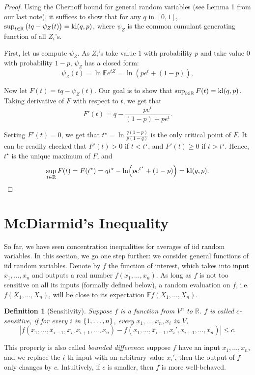 \documentclass{article}
\newtheorem{definition}{Definition}
\DeclareMathOperator*{\kl}{{\rm kl}}
\newcommand{\RR}{\mathbb{R}} %
\newcommand{\EE}{\mathbb{E}} %
\begin{document}
\begin{proof}
Using the Chernoff bound for general random variables (see Lemma 1 from our last note), it suffices to show that for any $q$ in $[0,1]$, $\sup_{t \in \RR} \del{t q - \psi_Z(t)} = \kl(q,p)$, where $\psi_Z$ is the common cumulant generating function of all $Z_i$'s.

First, let us compute $\psi_Z$.
As $Z_i$'s take value 1 with probability $p$ and take value 0 with probability $1-p$,
$\psi_Z$ has a closed form:
\[ \psi_Z(t) = \ln \EE e^{tZ} = \ln(p e^t + (1-p)), \]

Now let $F(t) = t q - \psi_Z(t)$. Our goal is to show that
$\sup_{t \in \RR} F(t) = \kl(q,p)$.
Taking derivative of $F$ with respect to $t$, we get
that
\[ F'(t) = q - \frac{p e^t}{(1-p) + p e^t}. \]

Setting $F'(t) = 0$, we get that $t^\star = \ln\frac{q(1-p)}{p(1-q)}$ is the only
critical point of $F$.
It can be readily checked that
$F'(t) > 0$ if $t < t^\star$, and $F'(t) \geq 0$ if $t > t^\star$. Hence,
$t^\star$ is the unique maximum of $F$, and
\[ \sup_{t \in \RR} F(t) = F(t^\star) = q t^\star - \ln(p e^{t^\star} + (1-p)) = \kl(q,p). \qedhere \]
\end{proof}

\section{McDiarmid's Inequality}

So far, we have seen concentration inequalities for averages of iid random variables.
In this section, we go one step further: we consider general functions of iid random variables. Denote by $f$ the function of interest, which takes into input $x_1, \ldots, x_n$ and outputs a real number $f(x_1,\ldots,x_n)$. As long as $f$ is not too sensitive on all its inputs (formally defined below), a random evaluation on $f$, i.e. $f(X_1, \ldots, X_n)$, will be close to its expectation $\EE f(X_1, \ldots, X_n)$.

\begin{definition}[Sensitivity]
Suppose $f$ is a function from $V^n$ to $\RR$. $f$ is called $c$-sensitive, if for every $i$ in $\cbr{1,\ldots,n}$, every $x_1, \ldots, x_n, x_i$ in $V$,
\[ |f(x_1, \ldots, x_{i-1}, x_i, x_{i+1}, \ldots, x_n) - f(x_1, \ldots, x_{i-1}, x_i', x_{i+1}, \ldots, x_n)| \leq c. \]
\end{definition}
This property is also called {\em bounded difference}: suppose $f$ have an input $x_1, \ldots, x_n$, and we replace the $i$-th input with an arbitrary value $x_i'$,
then the output of $f$ only changes by $c$. Intuitively, if $c$ is smaller, then $f$ is more well-behaved.
\end{document}
